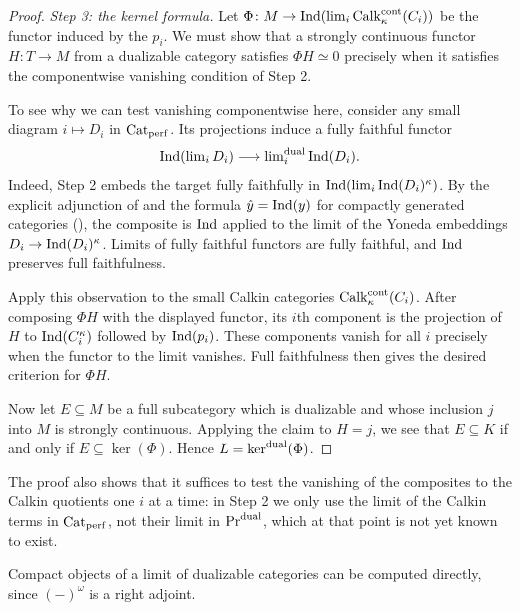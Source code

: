 \begin{proof}
		\emph{Step 3: the kernel formula.} Let $\Phi\colon M \to \operatorname{Ind}(\operatorname{lim}_i \operatorname{Calk}^{\operatorname{cont}}_{\kappa}(C_i))$ be the functor induced by the $p_i$. We must show that a strongly continuous functor $H\colon T\to M$ from a dualizable category satisfies $\Phi H\simeq 0$ precisely when it satisfies the componentwise vanishing condition of Step 2.

		To see why we can test vanishing componentwise here, consider any small diagram $i\mapsto D_i$ in ${\textup{Cat}}_{\operatorname{perf}}$. Its projections induce a fully faithful functor
		\[
			\operatorname{Ind}(\operatorname{lim}_i D_i)\longrightarrow \operatorname{lim}\nolimits^{\operatorname{dual}}_i\operatorname{Ind}(D_i).
		\]
		Indeed, Step 2 embeds the target fully faithfully in $\operatorname{Ind}(\operatorname{lim}_i \operatorname{Ind}(D_i)^\kappa)$. By the explicit adjunction of  and the formula $\hat y=\operatorname{Ind}(y)$ for compactly generated categories (), the composite is $\operatorname{Ind}$ applied to the limit of the Yoneda embeddings $D_i\to\operatorname{Ind}(D_i)^\kappa$. Limits of fully faithful functors are fully faithful, and $\operatorname{Ind}$ preserves full faithfulness.

		Apply this observation to the small Calkin categories $\operatorname{Calk}^{\operatorname{cont}}_{\kappa}(C_i)$. After composing $\Phi H$ with the displayed functor, its $i$th component is the projection of $H$ to $\operatorname{Ind}(C_i^\kappa)$ followed by $\operatorname{Ind}(p_i)$. These components vanish for all $i$ precisely when the functor to the limit vanishes. Full faithfulness then gives the desired criterion for $\Phi H$.

		Now let $E \subseteq M$ be a full subcategory which is dualizable and whose inclusion $j$ into $M$ is strongly continuous. Applying the claim to $H = j$, we see that $E \subseteq K$ if and only if $E \subseteq \ker(\Phi)$. Hence $L = \ker^{\operatorname{dual}}(\Phi)$.
	\end{proof}

	The proof also shows that it suffices to test the vanishing of the composites to the Calkin quotients one $i$ at a time: in Step 2 we only use the limit of the Calkin terms in ${\textup{Cat}}_{\operatorname{perf}}$, not their limit in $\textup{Pr}^{\operatorname{dual}}$, which at that point is not yet known to exist.

	Compact objects of a limit of dualizable categories can be computed directly, since $(-)^{\omega}$ is a right adjoint.

